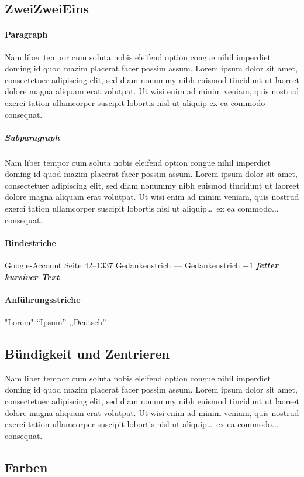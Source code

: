 \documentclass[a4paper, 12pt]{report}
\begin{document}
	\subsection{ZweiZweiEins}
	\paragraph{Paragraph}
	Nam liber tempor cum soluta nobis eleifend option congue nihil imperdiet doming id quod mazim placerat facer possim assum. Lorem ipsum dolor sit amet, consectetuer adipiscing elit, sed diam nonummy nibh euismod tincidunt ut laoreet dolore magna aliquam erat volutpat. Ut wisi enim ad minim veniam, quis nostrud exerci tation ullamcorper suscipit lobortis nisl ut aliquip ex ea commodo consequat. 
	\clearpage %
	\subparagraph{Subparagraph}
	Nam liber tempor cum soluta nobis eleifend option congue nihil imperdiet doming id quod mazim placerat facer possim assum. Lorem ipsum dolor sit amet, consectetuer adipiscing elit, sed diam nonummy nibh euismod tincidunt ut laoreet dolore magna aliquam erat volutpat. Ut wisi enim ad minim veniam, quis nostrud exerci tation ullamcorper suscipit lobortis nisl ut aliquip\ldots ~ex ea commodo... consequat. 
	\paragraph{Bindestriche}
	Google-Account
	Seite 42--1337
	Gedankenstrich --- Gedankenstrich
	$-1$
	\textbf{\textit{fetter kursiver Text}}
	\paragraph{Anführungsstriche}
	"Lorem" ``Ipsum'' ,,Deutsch''
	\subsection{Bündigkeit und Zentrieren}
	\begin{center}
		Nam liber tempor cum soluta nobis eleifend option congue nihil imperdiet doming id quod mazim placerat facer possim assum. Lorem ipsum dolor sit amet, consectetuer adipiscing elit, sed diam nonummy nibh euismod tincidunt ut laoreet dolore magna aliquam erat volutpat. Ut wisi enim ad minim veniam, quis nostrud exerci tation ullamcorper suscipit lobortis nisl ut aliquip\ldots ~ex ea commodo... consequat.
	\end{center}
	\subsection{Farben}
	\label{sec:farben}
	
\end{document}
